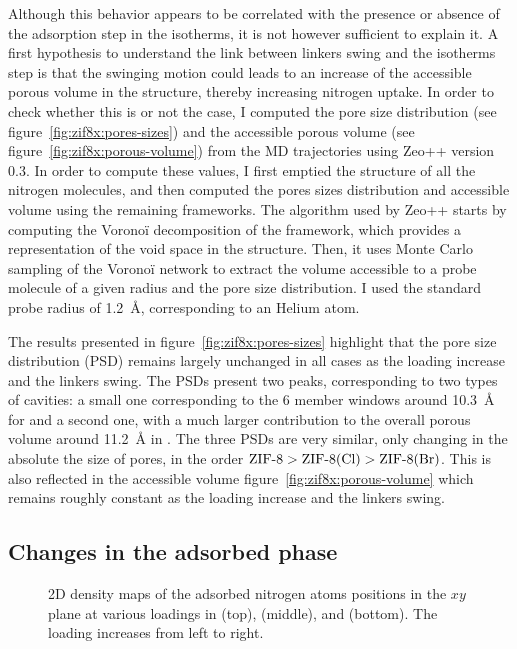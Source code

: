 \documentclass[thesis]{subfiles}
\begin{document}
Although this behavior appears to be correlated with the presence or absence of
the adsorption step in the isotherms, it is not however sufficient to explain
it. A first hypothesis to understand the link between linkers swing and the
isotherms step is that the swinging motion could leads to an increase of the
accessible porous volume in the structure, thereby increasing nitrogen uptake.
In order to check whether this is or not the case, I computed the pore size
distribution (see figure~\ref{fig:zif8x:pores-sizes}) and the accessible porous
volume (see figure~\ref{fig:zif8x:porous-volume}) from the MD trajectories using
Zeo++\cite{Willems2012} version 0.3. In order to compute these values, I first
emptied the structure of all the nitrogen molecules, and then computed the pores
sizes distribution and accessible volume using the remaining frameworks. The
algorithm used by Zeo++ starts by computing the Voronoï decomposition of the
framework, which provides a representation of the void space in the structure.
Then, it uses Monte Carlo sampling of the Voronoï network to extract the volume
accessible to a probe molecule of a given radius and the pore size distribution.
I used the standard probe radius of \SI{1.2}{\AA}, corresponding to an Helium
atom.


The results presented in figure~\ref{fig:zif8x:pores-sizes} highlight that the
pore size distribution (PSD) remains largely unchanged in all cases as the
loading increase and the linkers swing. The PSDs present two peaks,
corresponding to two types of cavities: a small one corresponding to the 6
member windows around \SI{10.3}{\AA} for  and a second one, with a much
larger contribution to the overall porous volume around \SI{11.2}{\AA} in .
The three PSDs are very similar, only changing in the absolute the size of
pores, in the order $\text{\ZIF8} > \text{\ZIFCl} > \text{\ZIFBr}$. This is also
reflected in the accessible volume figure~\ref{fig:zif8x:porous-volume} which
remains roughly constant as the loading increase and the linkers swing.

\subsection{Changes in the adsorbed phase}

\begin{figure}[ht]
    \centering
    
    \caption{2D density maps of the adsorbed nitrogen atoms positions in the $xy$
    plane at various loadings in  (top), \ZIFCl (middle), and \ZIFBr
    (bottom). The loading increases from left to right.}
    \label{fig:zif8x:density}
\end{figure}
\end{document}
